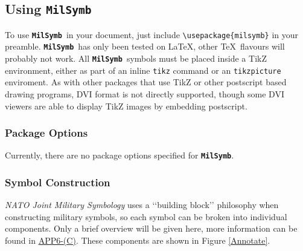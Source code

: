 \documentclass[a4paper, titlepage]{article}
\newcommand\MilSymb{\textbf{\texttt{MilSymb}}}
\newcommand\DocLink{\href{https://www.awl.edu.pl/images/en/APP_6_C.pdf}{APP6-(C)}}
\begin{document}
\subsection{Using \MilSymb}

To use \MilSymb\  in your document, just include \texttt{\textbackslash usepackage\{milsymb\}} in your preamble. \MilSymb\  has only been tested on \LaTeX, other \TeX\  flavours will probably not work. All \MilSymb\  symbols must be placed inside a TikZ environment, either as part of an inline \texttt{tikz} command or an \texttt{tikzpicture} enviroment. As with other packages that use TikZ or other postscript based drawing programs, DVI format is not directly supported, though some DVI viewers are able to display TikZ images by embedding postscript.

\subsubsection{Package Options}

Currently, there are no package options specified for \MilSymb.

\subsubsection{Symbol Construction}

\textit{NATO Joint Military Symbology} uses a \lq\lq{}building block\rq\rq{} philosophy when constructing military symbols, so each symbol can be broken into individual components. Only a brief overview will be given here, more information can be found in \DocLink. These components are shown in Figure \ref{Annotate}.
\end{document}
